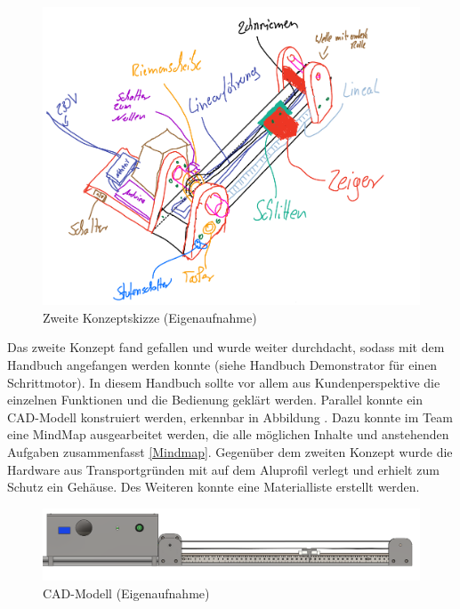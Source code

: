 \begin{figure}[H]
	\begin{center}
		\includegraphics[width=\textwidth]{Images/Konzeptskizze2.png}
		\caption{Zweite Konzeptskizze (Eigenaufnahme)} \label{ZweiteKonzeptskizze}
	\end{center}
\end{figure}

Das zweite Konzept fand gefallen und wurde weiter durchdacht, sodass mit dem Handbuch angefangen werden konnte (siehe Handbuch Demonstrator für einen Schrittmotor). In diesem Handbuch sollte vor allem aus Kundenperspektive die einzelnen Funktionen und die Bedienung geklärt werden. Parallel konnte ein CAD-Modell konstruiert werden, erkennbar in Abbildung . Dazu konnte im Team eine MindMap ausgearbeitet werden, die alle möglichen Inhalte und anstehenden Aufgaben zusammenfasst \ref{Mindmap}. Gegenüber dem zweiten Konzept wurde die Hardware aus Transportgründen mit auf dem Aluprofil verlegt und erhielt zum Schutz ein Gehäuse. Des Weiteren konnte eine Materialliste erstellt werden. 

\begin{figure}[H]
	\begin{center}
		\includegraphics[width=\textwidth]{Images/Konstruktion1.png}
		\caption{CAD-Modell (Eigenaufnahme)} \label{CADMOD}
	\end{center}
\end{figure} 

